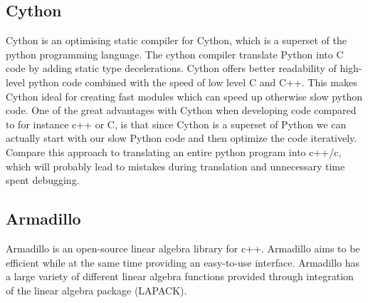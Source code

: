 \subsection*{Cython}
Cython is an optimising static compiler for Cython, which is a superset of the
python programming language. The cython compiler translate Python into C code by
adding static type decelerations. Cython offers better readability of high-level
python code combined with the speed of low level C and C++. This makes Cython ideal for
creating fast modules which can speed up otherwise slow python code. One of the
great advantages with Cython when developing code compared to for instance c++
or C, is that since Cython is a superset of Python we can actually start with
our slow Python code and then optimize the code iteratively. Compare this
approach to translating an entire python program into c++/c, which will probably
lead to mistakes during translation and unnecessary time spent debugging.

\subsection*{Armadillo}
Armadillo is an open-source linear algebra library for c++. Armadillo aims to
be efficient while at the same time providing an easy-to-use interface. Armadillo
has a large variety of different linear algebra functions provided through
integration of the linear algebra package (LAPACK).

